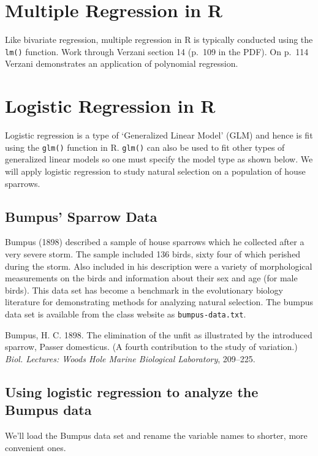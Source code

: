 \section{Multiple Regression in R}

Like bivariate regression, multiple regression in R is typically
conducted using the \lstinline!lm()! function. Work through Verzani
section 14 (p.~109 in the PDF). On p.~114 Verzani demonstrates an
application of polynomial regression.

\section{Logistic Regression in R}

Logistic regression is a type of `Generalized Linear Model' (GLM) and
hence is fit using the \lstinline!glm()! function in R.
\lstinline!glm()! can also be used to fit other types of generalized
linear models so one must specify the model type as shown below. We will
apply logistic regression to study natural selection on a population of
house sparrows.

\subsection{Bumpus' Sparrow Data}

Bumpus (1898) described a sample of house sparrows which he collected
after a very severe storm. The sample included 136 birds, sixty four of
which perished during the storm. Also included in his description were a
variety of morphological measurements on the birds and information about
their sex and age (for male birds). This data set has become a benchmark
in the evolutionary biology literature for demonstrating methods for
analyzing natural selection. The bumpus data set is available from the
class website as \lstinline!bumpus-data.txt!.

Bumpus, H. C. 1898. The elimination of the unfit as illustrated by the
introduced sparrow, Passer domesticus. (A fourth contribution to the
study of variation.) \emph{Biol. Lectures: Woods Hole Marine Biological
Laboratory}, 209--225.

\subsection{Using logistic regression to analyze the Bumpus data}

We'll load the Bumpus data set and rename the variable names to shorter,
more convenient ones.

